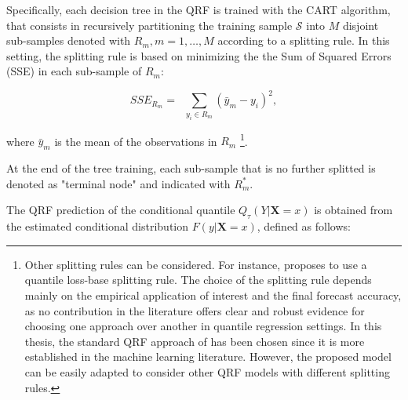 \noindent Specifically, each decision tree in the QRF is trained with the CART algorithm, that consists in recursively partitioning the training sample $\mathcal{S}$ into $M$ disjoint sub-samples denoted with $R_m, m=1, \dots, M$ according to a splitting rule. In this setting, the splitting rule is based on minimizing the the Sum of Squared Errors (SSE) in each sub-sample of $R_m$:

\begin{equation}
SSE_{R_m}= \; \; 
\sum_{y_i \in R_m} (\bar{y}_m - y_i)^2,
\end{equation} 

\noindent where $\bar{y}_m$ is the mean of the observations in $R_m$ \footnote{Other splitting rules can be considered. For instance, \cite{athey2019generalized} proposes to use a quantile loss-base splitting rule. The choice of the splitting rule depends mainly on the empirical application of interest and the final forecast accuracy, as no contribution in the literature offers clear and robust evidence for choosing one approach over another in quantile regression settings.
In this thesis, the standard QRF approach of \cite{meinshausen2006quantile} has been chosen since it is more established in the machine learning literature. However, the proposed model can be easily adapted to consider other QRF models with different splitting rules.}. 
\vspace{0.15in}


\noindent At the end of the tree training, each sub-sample that is no further splitted is denoted as "terminal node" and indicated with $R^{*}_m$. 

\vspace{0.15in}

\noindent The QRF prediction of the conditional quantile $Q_{\tau}(Y|\mathbf{X}=x)$ is obtained from the estimated conditional distribution $F(y |\mathbf{X}=x)$, defined as follows:





